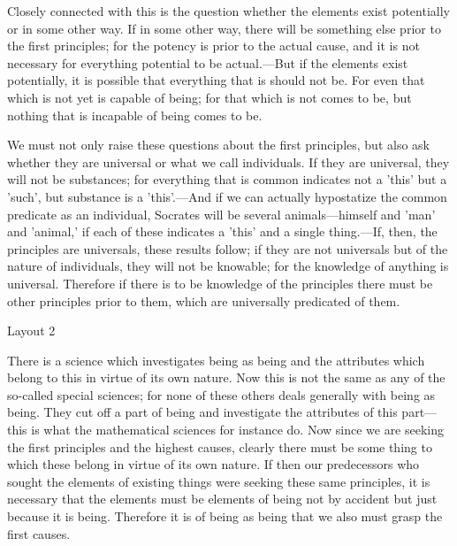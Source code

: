 Closely connected with this is the question whether the elements exist potentially or in some other way. If in some other way, there will be something else prior to the first principles; for the potency is prior to the actual cause, and it is not necessary for everything potential to be actual.—But if the elements exist potentially, it is possible that everything that is should not be. For even that which is not yet is capable of being; for that which is not comes to be, but nothing that is incapable of being comes to be.

We must not only raise these questions about the first principles, but also ask whether they are universal or what we call individuals. If they are universal, they will not be substances; for everything that is common indicates not a 'this' but a 'such', but substance is a 'this'.—And if we can actually hypostatize the common predicate as an individual, Socrates will be several animals—himself and 'man' and 'animal,' if each of these indicates a 'this' and a single thing.—If, then, the principles are universals, these results follow; if they are not universals but of the nature of individuals, they will not be knowable; for the knowledge of anything is universal. Therefore if there is to be knowledge of the principles there must be other principles prior to them, which are universally predicated of them.


Layout 2


There is a science which investigates being as being and the attributes which belong to this in virtue of its own nature. Now this is not the same as any of the so-called special sciences; for none of these others deals generally with being as being. They cut off a part of being and investigate the attributes of this part—this is what the mathematical sciences for instance do. Now since we are seeking the first principles and the highest causes, clearly there must be some thing to which these belong in virtue of its own nature. If then our predecessors who sought the elements of existing things were seeking these same principles, it is necessary that the elements must be elements of being not by accident but just because it is being. Therefore it is of being as being that we also must grasp the first causes.


